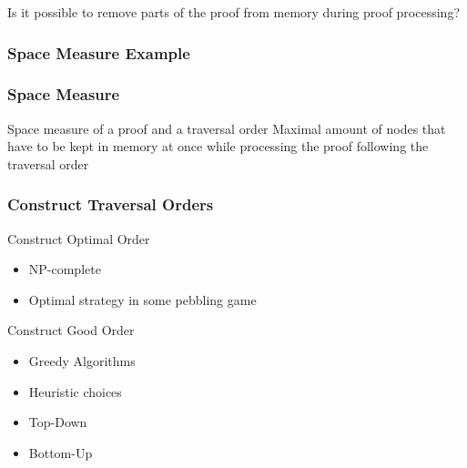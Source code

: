 \documentclass{beamer}
\begin{document}

\begin{frame}

Is it possible to remove parts of the proof from memory during proof processing?

\vspace{1cm}


\end{frame}

\begin{frame}
	\frametitle{Space Measure Example}
	
\end{frame}

\begin{frame}

\frametitle{Space Measure}

\begin{block}{Space measure of a proof and a traversal order}
	Maximal amount of nodes that have to be kept in memory at once while processing the proof following the traversal order
\end{block}

\end{frame}

\begin{frame}

\frametitle{Construct Traversal Orders}

\begin{block}{Construct Optimal Order}

\begin{itemize}

\item NP-complete
\item Optimal strategy in some pebbling game

\end{itemize}

\end{block}

\begin{block}{Construct Good Order}

\begin{itemize}
	\item Greedy Algorithms
	\item Heuristic choices
	\item Top-Down
	\item Bottom-Up
\end{itemize}

\end{block}

\end{frame}
\end{document}
